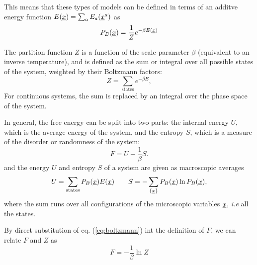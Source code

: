 This means that these types of models can be defined in terms of an additve energy function $E(\underline{x}) = \sum_{a} E_a(\underline{x}^a)$ as
\begin{equation}
 P_{B}(\underline{x}) = \frac 1 Z e^{-\beta E(\underline{x})} \label{eq:boltzmann}
\end{equation}

The partition function $Z$ is a function of the scale parameter $\beta$ (equivalent to an inverse temperature), and is defined as the sum or integral over all possible states of the system, weighted by their Boltzmann factors:
\begin{equation}
    Z = \sum_{\text{states}} e^{-\beta E},
\end{equation}
For continuous systems, the sum is replaced by an integral over the phase space of the system.


In general, the free energy can be split into two parts: the internal energy $U$, which is the average energy of the system, and the entropy $S$, which is a measure of the disorder or randomness of the system:
\begin{equation}
    F = U - \frac 1 \beta S.
\end{equation}
and the energy $U$ and entropy $S$ of a system are given as macroscopic averages
\begin{equation}
U = \sum_{\text{states}} P_B(\underline{x}) E(\underline{x}) \qquad    S = -\sum_{\{\underline{x}\}} P_B(\underline{x}) \ln P_B(\underline{x}),
\end{equation}
where the sum runs over all configurations of the microscopic variables $\underline{x}$, {\it i.e} all the states.

By direct substitution of eq. (\ref{eq:boltzmann}) int the definition of $F$, we can relate $F$ and $Z$ as
\[ F = - \frac 1 \beta \ln Z\]

